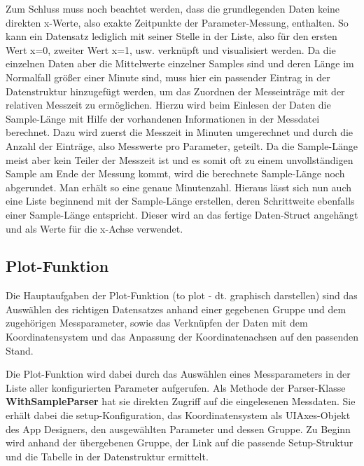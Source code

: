 Zum Schluss muss noch beachtet werden, dass die grundlegenden Daten keine direkten x-Werte, also exakte Zeitpunkte der Parameter-Messung, enthalten. So kann ein Datensatz lediglich mit seiner Stelle in der Liste, also für den ersten Wert x=0, zweiter Wert x=1, usw. verknüpft und visualisiert werden. Da die einzelnen Daten aber die Mittelwerte einzelner Samples sind und deren Länge im Normalfall größer einer Minute sind, muss hier ein passender Eintrag in der Datenstruktur hinzugefügt werden, um das Zuordnen der Messeinträge mit der relativen Messzeit zu ermöglichen. Hierzu wird beim Einlesen der Daten die Sample-Länge mit Hilfe der vorhandenen Informationen in der Messdatei berechnet. Dazu wird zuerst die Messzeit in Minuten umgerechnet und durch die Anzahl der Einträge, also Messwerte pro Parameter, geteilt. Da die Sample-Länge meist aber kein Teiler der Messzeit ist und es somit oft zu einem unvollständigen Sample am Ende der Messung kommt, wird die berechnete Sample-Länge noch abgerundet. Man erhält so eine genaue Minutenzahl. Hieraus lässt sich nun auch eine Liste beginnend mit der Sample-Länge erstellen, deren Schrittweite ebenfalls einer Sample-Länge entspricht. Dieser wird an das fertige Daten-Struct angehängt und als Werte für die x-Achse verwendet.

\begin{minipage}{\linewidth}

\end{minipage}

\subsection{Plot-Funktion}

Die Hauptaufgaben der Plot-Funktion (to plot - dt. graphisch darstellen) sind das Auswählen des richtigen Datensatzes anhand einer gegebenen Gruppe und dem zugehörigen Messparameter, sowie das Verknüpfen der Daten mit dem Koordinatensystem und das Anpassung der Koordinatenachsen auf den passenden Stand.

Die Plot-Funktion wird dabei durch das Auswählen eines Messparameters in der Liste aller konfigurierten Parameter aufgerufen. Als Methode der Parser-Klasse \textbf{WithSampleParser} hat sie direkten Zugriff auf die eingelesenen Messdaten. Sie erhält dabei die setup-Konfiguration, das Koordinatensystem als UIAxes-Objekt des App Designers, den ausgewählten Parameter und dessen Gruppe. Zu Beginn wird anhand der übergebenen Gruppe, der Link auf die passende Setup-Struktur und die Tabelle in der Datenstruktur ermittelt.

